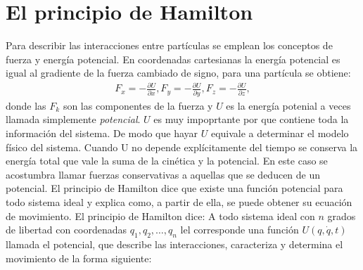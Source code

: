 \documentclass[letterpaper,12pt,oneside]{book}
\begin{document}
\section{El principio de Hamilton}
%
Para describir las interacciones entre part\'iculas se emplean los conceptos de fuerza y energ\'ia potencial. En coordenadas cartesianas la energ\'ia potencial es igual al gradiente de la fuerza cambiado de signo, para una part\'icula se obtiene:
%
\begin{eqnarray}
F_x=-\frac{\partial U}{\partial x}, F_y=-\frac{\partial U}{\partial y}, F_z=-\frac{\partial U}{\partial z},
\end{eqnarray}
%
donde las $F_k$ son las componentes de la fuerza y $U$ es la energ\'ia potenial a veces llamada simplemente \textit{potencial}. $U$ es muy impoprtante por que contiene toda la informaci\'on del sistema. De modo que hayar $U$ equivale a determinar el modelo f\'isico del sistema. Cuando U no depende expl\'icitamente del tiempo se conserva la energ\'ia total que vale la suma de la cin\'etica y la potencial. En este caso se acostumbra llamar fuerzas conservativas a aquellas que se deducen de un potencial. El principio de Hamilton dice que existe una funci\'on potencial para todo sistema ideal y explica como, a partir de ella, se puede obtener su ecuaci\'on de movimiento. 
%
El principio de Hamilton dice: A todo sistema ideal con $n$ grados de libertad con coordenadas $q_1, q_2, \dots , q_n$ lel corresponde una funci\'on $U(q,\dot q, t)$ llamada el potencial, que describe las interacciones, caracteriza y determina el movimiento de la forma siguiente:\\
\end{document}
